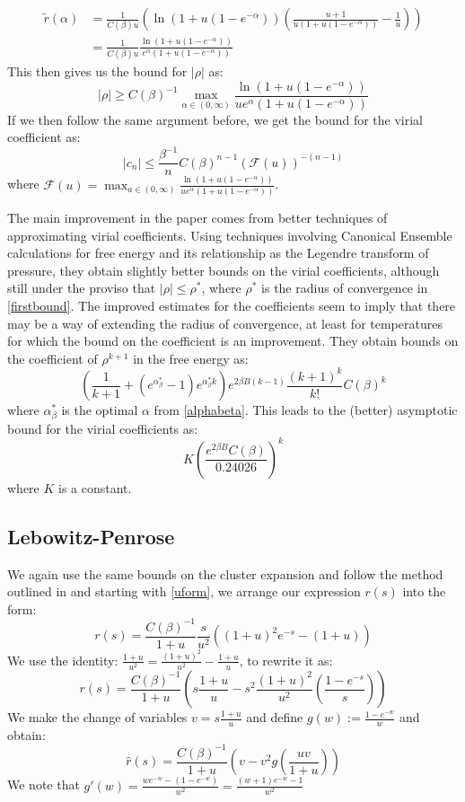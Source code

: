 \documentclass[reqno]{amsart}
\def\be{\begin{equation}}
\def\ee{\end{equation}}
\numberwithin{equation}{section}
\begin{document}
\begin{align}
\tilde{r}(\alpha)&=\frac{1}{C(\beta)u}\left(\ln(1+u(1-e^{-\alpha}))\left(\frac{u+1}{u(1+u(1-e^{-\alpha}))}-\frac{1}{u}\right)\right) \label{tildeeqn} \\
&=  \frac{1}{C(\beta)u} \frac{\ln(1+u(1-e^{-\alpha}))}{e^{\alpha}(1+u(1-e^{-\alpha}))}
\end{align}
This then gives us the bound for $|\rho|$ as:
\be |\rho| \geq C(\beta)^{-1}\max_{\alpha \in (0, \infty)} \frac{\ln(1+u(1-e^{-\alpha}))}{ue^{\alpha}(1+u(1-e^{-\alpha}))} \label{alphabeta} \ee
If we then follow the same argument before, we get the bound for the virial coefficient as:
\be |c_n| \leq \frac{\beta^{-1}}{n}C(\beta)^{n-1} (\mathcal{F}(u))^{-(n-1)} \ee
where $\mathcal{F}(u)=\max_{a \in (0, \infty)} \frac{\ln(1+u(1-e^{-\alpha}))}{ue^{\alpha}(1+u(1-e^{-\alpha}))}$. 

The main improvement in the paper comes from better techniques of approximating virial coefficients. Using techniques involving Canonical Ensemble calculations for free energy and its relationship as the Legendre transform of pressure, they obtain slightly better bounds on the virial coefficients, although still under the proviso that $|\rho| \leq \rho^*$, where $\rho^*$ is the radius of convergence in \eqref{firstbound}. The improved estimates for the coefficients seem to imply that there may be a way of extending the radius of convergence, at least for temperatures for which the bound on the coefficient is an improvement.
They obtain bounds on the coefficient of $\rho^{k+1}$ in the free energy as:
\be \left( \frac{1}{k+1}+(e^{\alpha^*_{\beta}}-1)e^{\alpha^*_{\beta}k}\right)e^{2\beta B(k-1)}\frac{(k+1)^k}{k!}C(\beta)^k \ee
where $\alpha^*_{\beta}$ is the optimal $\alpha$ from \eqref{alphabeta}. This leads to the (better) asymptotic bound for the virial coefficients as:
\be K\left(\frac{e^{2\beta B}C(\beta)}{0.24026}\right)^k \ee where $K$ is a constant.

\subsection{Lebowitz-Penrose}
We again use the same bounds on the cluster expansion and follow the method outlined in \cite{LPen64} and starting with \eqref{uform}, we arrange our expression $r(s)$ into the form:
\be r(s)=\frac{C(\beta)^{-1}}{1+u}\frac{s}{u^2}\left((1+u)^2e^{-s}-(1+u)\right) \label{lebpenstart}\ee
We use the identity: $\frac{1+u}{u^2}=\frac{(1+u)^2}{u^2}-\frac{1+u}{u} $, to rewrite it as:
\be r(s)=\frac{C(\beta)^{-1}}{1+u}\left(s\frac{1+u}{u}-s^2\frac{(1+u)^2}{u^2}\left(\frac{1-e^{-s}}{s}\right)\right) \ee
We make the change of variables $v= s\frac{1+u}{u}$ and define $g(w):=\frac{1-e^{-w}}{w}$ and obtain:
\be \hat{r}(s)=\frac{C(\beta)^{-1}}{1+u}(v-v^2g\left(\frac{uv}{1+u}\right)) \ee
We note that $g'(w)=\frac{we^{-w}-(1-e^{-w})}{w^2}=\frac{(w+1)e^{-w}-1}{w^2}$
\end{document}

